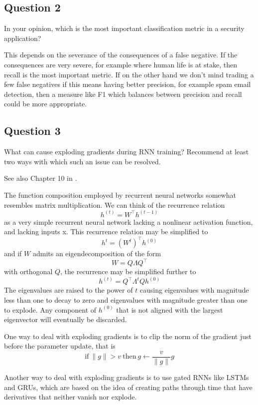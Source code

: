 \documentclass{article}
\begin{document}
\subsection{Question 2}
\begin{tcolorbox}
    In your opinion, which is the most important classification metric in a security application?
\end{tcolorbox}

This depends on the severance of the consequences of a false negative. If the consequences are very severe, for example where human life is at stake, then recall is the most important metric. If on the other hand we don’t mind trading a few false negatives if this means having better precision, for example spam email detection, then a measure like F1 which balances between precision and recall could be more appropriate.

\subsection{Question 3}
\begin{tcolorbox}
    What can cause exploding gradients during RNN training? Recommend at least two ways with which such an issue can be resolved.
\end{tcolorbox}

See also Chapter 10 in \cite{Goodfellow-et-al-2016}.

The function composition employed by recurrent neural networks somewhat resembles matrix multiplication. We can think of the recurrence relation
\[h^{(t)} = W^\top h^{(t-1)}\]
as a very simple recurrent neural network lacking a nonlinear activation function, and lacking inputs x. This recurrence relation may be simplified to
\[h^{t} = \left( W^t \right)^\top h^{(0)}\]
and if \(W\) admits an eigendecomposition of the form
\[W = Q \Lambda Q^\top\]
with orthogonal \(Q\), the recurrence may be simplified further to
\[h^{(t)} = Q^\top \Lambda^t Q h^{(0)}\]
The eigenvalues are raised to the power of \(t\) causing eigenvalues with magnitude less than one to decay to zero and eigenvalues with magnitude greater than one to explode. Any component of \(h^{(0)}\) that is not aligned with the largest eigenvector will eventually be discarded.

One way to deal with exploding gradients is to clip the norm of the gradient just before the parameter update, that is 
\[\text{if}\ \lVert g \rVert > v\ \text{then}\ g \gets \frac{v}{\lVert g \rVert} g\]

Another way to deal with exploding gradients is to use gated RNNs like LSTMs and GRUs, which are based on the idea of creating paths through time that have derivatives that neither vanish nor explode.



\end{document}
